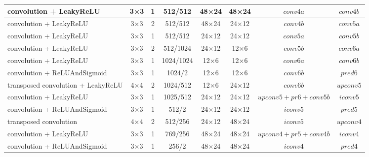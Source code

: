 \begin{table}[htbp]
\begin{adjustbox}{width=1\textwidth}
\begin{tabular}{|l|c|c|c|c|c|c|c|}
convolution + LeakyReLU                            & 3×3             & 1               & 512/512         & 48×24           & 48×24           & $conv4a$             & $conv4b$          \\ \hline
convolution + LeakyReLU                            & 3×3             & 2               & 512/512         & 48×24           & 24×12           & $conv4b$             & $conv5a$          \\ \hline
convolution + LeakyReLU                            & 3×3             & 1               & 512/512         & 24×12           & 24×12           & $conv5a$             & $conv5b$          \\ \hline
convolution + LeakyReLU                            & 3×3             & 2               & 512/1024        & 24×12           & 12×6            & $conv5b$             & $conv6a$          \\ \hline
convolution + LeakyReLU                            & 3×3             & 1               & 1024/1024       & 12×6            & 12×6            & $conv6a$             & $conv6b$          \\ \hline
convolution + ReLUAndSigmoid                           & 3×3             & 1               & 1024/2          & 12×6            & 12×6            & $conv6b$             & $pred6$           \\ \hline
transposed convolution + LeakyReLU                 & 4×4             & 2               & 1024/512        & 12×6            & 24×12           & $conv6b$             & $upconv5$         \\ \hline
convolution + LeakyReLU                           & 3×3             & 1               & 1025/512        & 24×12           & 24×12           & $upconv5+pr6+conv5b$ & $iconv5$          \\ \hline
convolution + ReLUAndSigmoid                           & 3×3             & 1               & 512/2           & 24×12           & 24×12           & $iconv5$             & $pred5$           \\ \hline
transposed convolution                 & 4×4             & 2               & 512/256         & 24×12           & 48×24           & $iconv5$             & $upconv4$         \\ \hline
convolution + LeakyReLU                           & 3×3             & 1               & 769/256         & 48×24           & 48×24           & $upconv4+pr5+conv4b$ & $iconv4$          \\ \hline
convolution + ReLUAndSigmoid                           & 3×3             & 1               & 256/2           & 48×24           & 48×24           & $iconv4$             & $pred4$           \\ \hline

\end{tabular}
\end{adjustbox}
\end{table}
